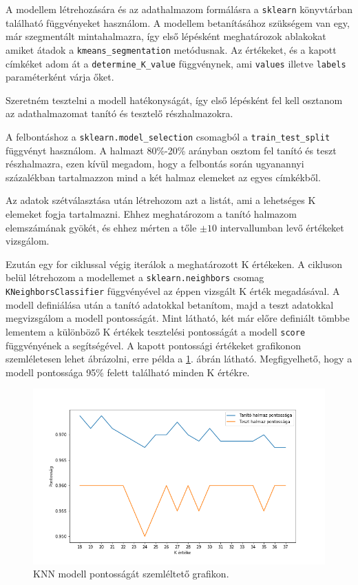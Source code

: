 A modellem létrehozására és az adathalmazom formálásra a \texttt{sklearn} könyvtárban található függvényeket használom. A modellem betanításához szükségem van egy, már szegmentált mintahalmazra, így első lépésként meghatározok ablakokat amiket átadok a \texttt{kmeans\_segmentation} metódusnak. Az értékeket, és a kapott címkéket adom át a \texttt{determine\_K\_value} függvénynek, ami \texttt{values} illetve \texttt{labels} paraméterként várja őket.

Szeretném tesztelni a modell hatékonyságát, így első lépésként fel kell osztanom az adathalmazomat tanító és tesztelő részhalmazokra.

A felbontáshoz a \texttt{sklearn.model\_selection} csomagból a \texttt{train\_test\_split} függvényt használom. A halmazt 80\%-20\% arányban osztom fel tanító és teszt részhalmazra, ezen kívül megadom, hogy a felbontás során ugyanannyi százalékban tartalmazzon mind a két halmaz elemeket az egyes címkékből.

Az adatok szétválasztása után létrehozom azt a listát, ami a lehetséges K elemeket fogja tartalmazni. Ehhez meghatározom a tanító halmazom elemszámának gyökét, és ehhez mérten a tőle $\pm 10$ intervallumban levő értékeket vizsgálom.

Ezután egy for ciklussal végig iterálok a meghatározott K értékeken. A cikluson belül létrehozom a modellemet a \texttt{sklearn.neighbors} csomag \texttt{KNeighborsClassifier} függvényével az éppen vizsgált K érték megadásával. A modell definiálása után a tanító adatokkal betanítom, majd a teszt adatokkal megvizsgálom a modell pontosságát. Mint látható, két már előre definiált tömbbe lementem a különböző K értékek tesztelési pontosságát a modell \texttt{score} függvényének a segítségével. A kapott pontossági értékeket grafikonon szemléletesen lehet ábrázolni, erre példa a \ref{fig:knn_accuracy}. ábrán látható. Megfigyelhető, hogy a modell pontossága 95\% felett található minden K értékre.

\begin{figure}[h]
\centering
\includegraphics[scale=0.6]{images/knn_accuracy.png}
\caption{KNN modell pontosságát szemléltető grafikon.}
\label{fig:knn_accuracy}
\end{figure}

